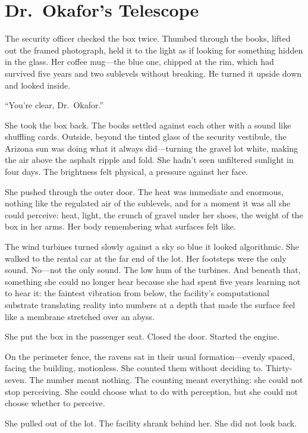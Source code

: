 \chapter{Dr.\ Okafor's Telescope}

The security officer checked the box twice. Thumbed through the books, lifted out the framed photograph, held it to the light as if looking for something hidden in the glass. Her coffee mug---the blue one, chipped at the rim, which had survived five years and two sublevels without breaking. He turned it upside down and looked inside.

``You're clear, Dr.\ Okafor.''

She took the box back. The books settled against each other with a sound like shuffling cards. Outside, beyond the tinted glass of the security vestibule, the Arizona sun was doing what it always did---turning the gravel lot white, making the air above the asphalt ripple and fold. She hadn't seen unfiltered sunlight in four days. The brightness felt physical, a pressure against her face.

She pushed through the outer door. The heat was immediate and enormous, nothing like the regulated air of the sublevels, and for a moment it was all she could perceive: heat, light, the crunch of gravel under her shoes, the weight of the box in her arms. Her body remembering what surfaces felt like.

The wind turbines turned slowly against a sky so blue it looked algorithmic. She walked to the rental car at the far end of the lot. Her footsteps were the only sound. No---not the only sound. The low hum of the turbines. And beneath that, something she could no longer hear because she had spent five years learning not to hear it: the faintest vibration from below, the facility's computational substrate translating reality into numbers at a depth that made the surface feel like a membrane stretched over an abyss.

She put the box in the passenger seat. Closed the door. Started the engine.

On the perimeter fence, the ravens sat in their usual formation---evenly spaced, facing the building, motionless. She counted them without deciding to. Thirty-seven. The number meant nothing. The counting meant everything: she could not stop perceiving. She could choose what to do with perception, but she could not choose whether to perceive.

She pulled out of the lot. The facility shrank behind her. She did not look back.

